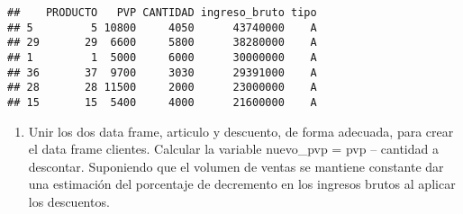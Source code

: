 \documentclass[
  12pt,
]{article}
\newenvironment{Shaded}{\begin{snugshade}}{\end{snugshade}}
\newcommand{\AttributeTok}[1]{\textcolor[rgb]{0.77,0.63,0.00}{#1}}
\newcommand{\CommentTok}[1]{\textcolor[rgb]{0.56,0.35,0.01}{\textit{#1}}}
\newcommand{\ConstantTok}[1]{\textcolor[rgb]{0.00,0.00,0.00}{#1}}
\newcommand{\DecValTok}[1]{\textcolor[rgb]{0.00,0.00,0.81}{#1}}
\newcommand{\FunctionTok}[1]{\textcolor[rgb]{0.00,0.00,0.00}{#1}}
\newcommand{\NormalTok}[1]{#1}
\newcommand{\OtherTok}[1]{\textcolor[rgb]{0.56,0.35,0.01}{#1}}
\newcommand{\SpecialCharTok}[1]{\textcolor[rgb]{0.00,0.00,0.00}{#1}}
\newcommand{\StringTok}[1]{\textcolor[rgb]{0.31,0.60,0.02}{#1}}
\providecommand{\tightlist}{%
  \setlength{\itemsep}{0pt}\setlength{\parskip}{0pt}}
\begin{document}
\begin{Shaded}
\end{Shaded}

\begin{verbatim}
##    PRODUCTO   PVP CANTIDAD ingreso_bruto tipo
## 5         5 10800     4050      43740000    A
## 29       29  6600     5800      38280000    A
## 1         1  5000     6000      30000000    A
## 36       37  9700     3030      29391000    A
## 28       28 11500     2000      23000000    A
## 15       15  5400     4000      21600000    A
\end{verbatim}

\begin{enumerate}
\def\labelenumi{\alph{enumi})}
\setcounter{enumi}{2}
\tightlist
\item
  Unir los dos data frame, articulo y descuento, de forma adecuada, para
  crear el data frame clientes. Calcular la variable nuevo\_pvp = pvp --
  cantidad a descontar. Suponiendo que el volumen de ventas se mantiene
  constante dar una estimación del porcentaje de decremento en los
  ingresos brutos al aplicar los descuentos.
\end{enumerate}
\end{document}
